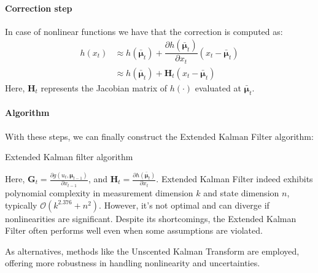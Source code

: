 \paragraph*{Correction step}
In case of nonlinear functions we have that the correction is computed as: 
\begin{align*}
    h(x_t)  &\approx h(\bar{\boldsymbol{\mu}}_t)+\dfrac{\partial h(\bar{\boldsymbol{\mu}}_t)}{\partial x_t}(x_t-\bar{\boldsymbol{\mu}}_t) \\
            &\approx h(\bar{\boldsymbol{\mu}}_t)+\mathbf{H}_t(x_t-\bar{\boldsymbol{\mu}}_t)
\end{align*} 
Here, $\mathbf{H}_t$ represents the Jacobian matrix of $h(\cdot)$ evaluated at $\bar{\boldsymbol{\mu}}_t$. 

\paragraph*{Algorithm}
With these steps, we can finally construct the Extended Kalman Filter algorithm:
\begin{algorithm}[H]
    \caption{Extended Kalman filter algorithm}
        \begin{algorithmic}[1]
             
              
            \State{}
        \end{algorithmic}
\end{algorithm}
Here, $\mathbf{G}_t=\frac{\partial g(u_t,\boldsymbol{\mu}_{t-1})}{\partial x_{t-1}}$, and $\mathbf{H}_t=\frac{\partial h(\bar{\boldsymbol{\mu}}_t)}{\partial x_t}$. 
Extended Kalman Filter indeed exhibits polynomial complexity in measurement dimension $k$ and state dimension $n$, typically $\mathcal{O}(k^{2.376} + n^2)$. 
However, it's not optimal and can diverge if nonlinearities are significant. 
Despite its shortcomings, the Extended Kalman Filter often performs well even when some assumptions are violated.

As alternatives, methods like the Unscented Kalman Transform are employed, offering more robustness in handling nonlinearity and uncertainties.
